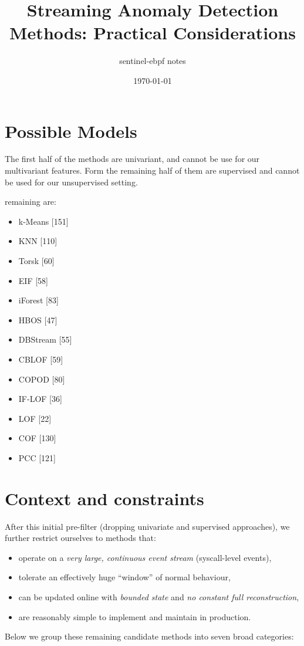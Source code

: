 \documentclass[a4paper,11pt]{article}
\title{Streaming Anomaly Detection Methods: Practical Considerations}
\author{sentinel-ebpf notes}
\date{\today}
\begin{document}
\maketitle

\section{Possible Models}
The first half of the methods are univariant, and cannot be use for our multivariant features.
Form the remaining half of them are supervised and cannot be used for our unsupervised setting.

remaining are:
\begin{itemize}
  \item k-Means [151]
  \item KNN [110]
  \item Torsk [60]
  \item EIF [58]
  \item iForest [83]
  \item HBOS [47]
  \item DBStream [55]
  \item CBLOF [59]
  \item COPOD [80]
  \item IF-LOF [36]
  \item LOF [22]
  \item COF [130]
  \item PCC [121]
\end{itemize}

\section{Context and constraints}
After this initial pre-filter (dropping univariate and supervised approaches), we further restrict ourselves to methods that:
\begin{itemize}
  \item operate on a \emph{very large, continuous event stream} (syscall-level events),
  \item tolerate an effectively huge ``window'' of normal behaviour,
  \item can be updated online with \emph{bounded state} and \emph{no constant full reconstruction},
  \item are reasonably simple to implement and maintain in production.
\end{itemize}

Below we group these remaining candidate methods into seven broad categories:
\end{document}
